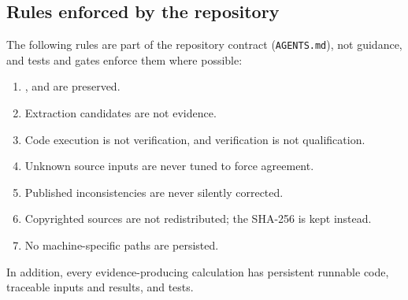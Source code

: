 \subsection{Rules enforced by the repository}
The following rules are part of the repository contract (\texttt{AGENTS.md}), not guidance, and tests and gates enforce them where possible:
\begin{enumerate}[leftmargin=1.6em]
  \item {},  and  are preserved.
  \item Extraction candidates are not evidence.
  \item Code execution is not verification, and verification is not qualification.
  \item Unknown source inputs are never tuned to force agreement.
  \item Published inconsistencies are never silently corrected.
  \item Copyrighted sources are not redistributed; the SHA-256 is kept instead.
  \item No machine-specific paths are persisted.
\end{enumerate}
In addition, every evidence-producing calculation has persistent runnable code, traceable inputs and results, and tests.
